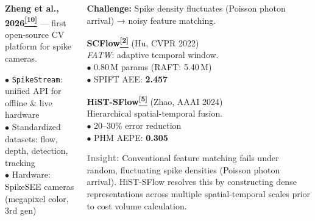 \documentclass[final]{beamer}
\newcommand{\paper}[1]{\hyperlink{ref:#1}{\textcolor{TealAccent}{\textsuperscript{\textbf{[#1]}}}}}
\newcommand{\metric}[1]{\textcolor{AccentOrange}{\textbf{#1}}}
\newlength{\CW}\setlength{\CW}{38.0cm}    %
\newlength{\FW}\setlength{\FW}{119.0cm}   %
\begin{document}
\begin{frame}[t]{}
\begin{columns}[T,totalwidth=\FW]
\begin{column}{\CW}
\vspace{0.25cm}

\begin{tcolorbox}[pbox=ToolCol,
  title={SpikeCV: Open Spike Vision Platform\paper{10}}]
\normalsize
\textbf{Zheng et al., 2026\paper{10}} — first open-source CV platform for spike cameras.

\medskip
$\bullet$ \texttt{SpikeStream}: unified API for offline \& live hardware\\
$\bullet$ Standardized datasets: flow, depth, detection, tracking\\
$\bullet$ Hardware: SpikeSEE cameras (megapixel color, 3rd gen)
\end{tcolorbox}

\end{column}

\begin{column}{\CW}

\begin{tcolorbox}[pbox=FlowCol,
  title={Dense Prediction I — Optical Flow\paper{2}\paper{5}}]
\normalsize

\textbf{Challenge:} Spike density fluctuates (Poisson photon arrival) → noisy feature matching.

\medskip
\begin{minipage}[t]{0.48\linewidth}
\textbf{SCFlow\paper{2}} (Hu, CVPR 2022)\\
\emph{FATW}: adaptive temporal window.\\[2pt]
$\bullet$ 0.80\,M params (RAFT: 5.40\,M)\\
$\bullet$ SPIFT AEE: \metric{2.457}
\end{minipage}\hfill
\begin{minipage}[t]{0.48\linewidth}
\textbf{HiST-SFlow\paper{5}} (Zhao, AAAI 2024)\\
Hierarchical spatial-temporal fusion.\\[2pt]
$\bullet$ 20–30\% error reduction\\
$\bullet$ PHM AEPE: \metric{0.305}
\end{minipage}

\smallskip
\textcolor{gray}{\textbf{Insight:}} Conventional feature matching fails under random, fluctuating spike densities (Poisson photon arrival). HiST-SFlow resolves this by constructing dense representations across multiple spatial-temporal scales prior to cost volume calculation.


\end{tcolorbox}
\end{column}
\end{columns}
\end{frame}
\end{document}
